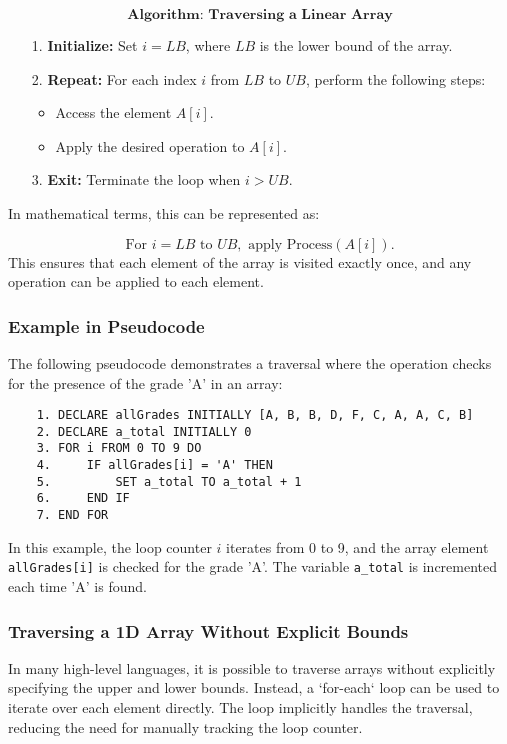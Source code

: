 \documentclass[12pt, oneside]{book}
\begin{document}
\[
\textbf{Algorithm: Traversing a Linear Array}
\]
\begin{itemize}
	\item[1.] \textbf{Initialize:} Set \( i = LB \), where \( LB \) is the lower bound of the array.
	\item[2.] \textbf{Repeat:} For each index \( i \) from \( LB \) to \( UB \), perform the following steps:
	\begin{itemize}
		\item Access the element \( A[i] \).
		\item Apply the desired operation to \( A[i] \).
	\end{itemize}
	\item[3.] \textbf{Exit:} Terminate the loop when \( i > UB \).
\end{itemize}
In mathematical terms, this can be represented as:

\[
\text{For } i = LB \text{ to } UB, \text{ apply } \text{Process}(A[i]).
\]
This ensures that each element of the array is visited exactly once, and any operation can be applied to each element.

\subsubsection{ Example in Pseudocode}

The following pseudocode demonstrates a traversal where the operation checks for the presence of the grade 'A' in an array:

\begin{verbatim}
	1. DECLARE allGrades INITIALLY [A, B, B, D, F, C, A, A, C, B]
	2. DECLARE a_total INITIALLY 0
	3. FOR i FROM 0 TO 9 DO
	4.     IF allGrades[i] = 'A' THEN
	5.         SET a_total TO a_total + 1
	6.     END IF
	7. END FOR
\end{verbatim}
In this example, the loop counter \( i \) iterates from 0 to 9, and the array element \texttt{allGrades[i]} is checked for the grade 'A'. The variable \texttt{a\_total} is incremented each time 'A' is found.

\subsubsection{Traversing a 1D Array Without Explicit Bounds}
In many high-level languages, it is possible to traverse arrays without explicitly specifying the upper and lower bounds. Instead, a `for-each` loop can be used to iterate over each element directly. The loop implicitly handles the traversal, reducing the need for manually tracking the loop counter.
\end{document}
